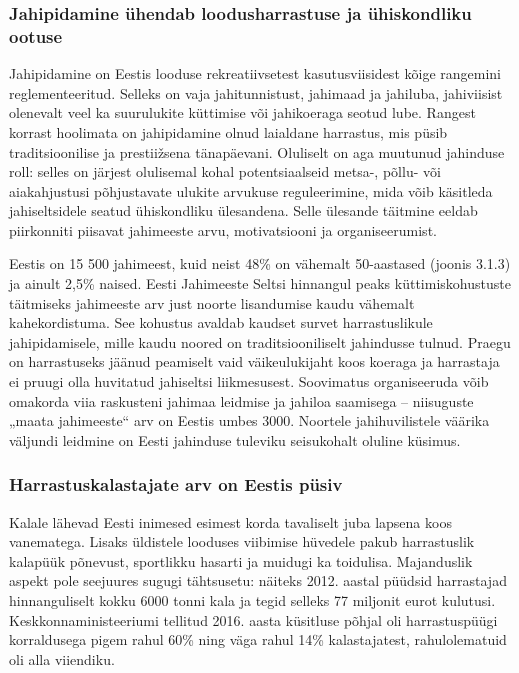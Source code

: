\documentclass[estonian,]{article}
\begin{document}
\hypertarget{jahipidamine-uxfchendab-loodusharrastuse-ja-uxfchiskondliku-ootuse}{%
\subsubsection*{Jahipidamine ühendab loodusharrastuse ja ühiskondliku ootuse}\label{jahipidamine-uxfchendab-loodusharrastuse-ja-uxfchiskondliku-ootuse}}

Jahipidamine on Eestis looduse rekreatiivsetest kasutusviisidest kõige rangemini reglementeeritud. Selleks on vaja jahitunnistust, jahimaad ja jahiluba, jahiviisist olenevalt veel ka suurulukite küttimise või jahikoeraga seotud lube. Rangest korrast hoolimata on jahipidamine olnud laialdane harrastus, mis püsib traditsioonilise ja prestiižsena tänapäevani. Oluliselt on aga muutunud jahinduse roll: selles on järjest olulisemal kohal potentsiaalseid metsa-, põllu- või aiakahjustusi põhjustavate ulukite arvukuse reguleerimine, mida võib käsitleda jahiseltsidele seatud ühiskondliku ülesandena. Selle ülesande täitmine eeldab piirkonniti piisavat jahimeeste arvu, motivatsiooni ja organiseerumist.

Eestis on 15 500 jahimeest, kuid neist 48\% on vähemalt 50-aastased (joonis 3.1.3) ja ainult 2,5\% naised. Eesti Jahimeeste Seltsi hinnangul peaks küttimiskohustuste täitmiseks jahimeeste arv just noorte lisandumise kaudu vähemalt kahekordistuma. See kohustus avaldab kaudset survet harrastuslikule jahipidamisele, mille kaudu noored on traditsiooniliselt jahindusse tulnud. Praegu on harrastuseks jäänud peamiselt vaid väikeulukijaht koos koeraga ja harrastaja ei pruugi olla huvitatud jahiseltsi liikmesusest. Soovimatus organiseeruda võib omakorda viia raskusteni jahimaa leidmise ja jahiloa saamisega -- niisuguste „maata jahimeeste`` arv on Eestis umbes 3000. Noortele jahihuvilistele väärika väljundi leidmine on Eesti jahinduse tuleviku seisukohalt oluline küsimus.

\hypertarget{harrastuskalastajate-arv-on-eestis-puxfcsiv}{%
\subsubsection*{Harrastuskalastajate arv on Eestis püsiv}\label{harrastuskalastajate-arv-on-eestis-puxfcsiv}}

Kalale lähevad Eesti inimesed esimest korda tavaliselt juba lapsena koos vanematega. Lisaks üldistele looduses viibimise hüvedele pakub harrastuslik kalapüük põnevust, sportlikku hasarti ja muidugi ka toidulisa. Majanduslik aspekt pole seejuures sugugi tähtsusetu: näiteks 2012. aastal püüdsid harrastajad hinnanguliselt kokku 6000 tonni kala ja tegid selleks 77 miljonit eurot kulutusi. Keskkonnaministeeriumi tellitud 2016. aasta küsitluse põhjal oli harrastuspüügi korraldusega pigem rahul 60\% ning väga rahul 14\% kalastajatest, rahulolematuid oli alla viiendiku.
\end{document}
